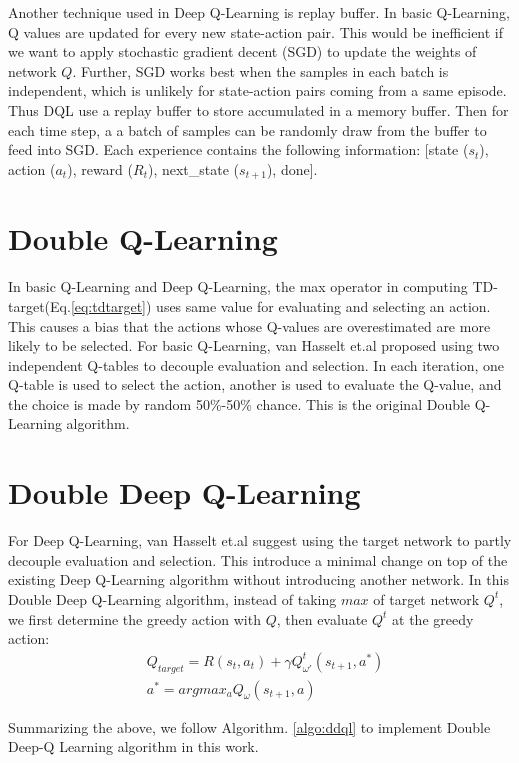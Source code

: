 \documentclass[conference]{IEEEtran}
\begin{document}
Another technique used in Deep Q-Learning is replay buffer. In basic Q-Learning, Q values are updated for every new state-action pair. This would be inefficient if we want to apply stochastic gradient decent (SGD) to update the weights of network $Q$. Further, SGD works best when the samples in each batch is independent, which is unlikely for state-action pairs coming from a same episode. Thus DQL use a replay buffer to store accumulated in a memory buffer. Then for each time step, a a batch of samples can be randomly draw from the buffer to feed into SGD. Each experience contains the following information: [state ($s_t$), action ($a_t$), reward ($R_t$), next\_state ($s_{t+1}$), done].

\section{Double Q-Learning}
In basic Q-Learning and Deep Q-Learning, the max operator in computing TD-target(Eq.\ref{eq:tdtarget})  uses same value for evaluating and selecting an action. This causes a bias that the actions whose Q-values are overestimated are more likely to be selected. For basic Q-Learning, van Hasselt et.al proposed using two independent Q-tables to decouple evaluation and selection. In each iteration, one Q-table is used to select the action, another is used to evaluate the Q-value, and the choice is made by random 50\%-50\% chance. This is the original Double Q-Learning algorithm.

\section{Double Deep Q-Learning}
For Deep Q-Learning, van Hasselt et.al suggest using the target network to partly decouple evaluation and selection. This introduce a minimal change on top of the existing Deep Q-Learning algorithm without introducing another network. In this Double Deep Q-Learning algorithm, instead of taking $max$ of target network $Q^t$, we first determine the greedy action with $Q$, then evaluate $Q^t$ at the greedy action:
\begin{align}
& Q_{target} = R(s_t, a_t) + \gamma Q^t_{\omega'}(s_{t+1}, a^*) \\
& a^* = argmax_a Q_\omega(s_{t+1}, a)
\end{align}

Summarizing the above, we follow Algorithm. \ref{algo:ddql} to implement Double Deep-Q Learning algorithm in this work.
\end{document}
